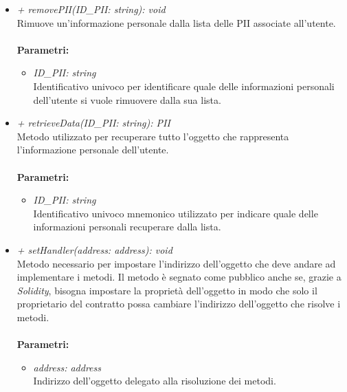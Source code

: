 \begin{itemize}
\begin{itemize}
		\item \textit{+ removePII(ID\_PII: string): void}\\
		Rimuove un'informazione personale dalla lista delle \gls{PII} associate all'utente.\\\\
		\textbf{Parametri:}
		\begin{itemize}
			\item \textit{ID\_PII: string}\\
			Identificativo univoco per identificare quale delle informazioni personali dell'utente si vuole rimuovere dalla sua lista.
		\end{itemize}
		\item \textit{+ retrieveData(ID\_PII: string): PII}\\
		Metodo utilizzato per recuperare tutto l'oggetto che rappresenta l'informazione personale dell'utente.\\\\
		\textbf{Parametri:}
		\begin{itemize}
			\item \textit{ID\_PII: string}\\
			Identificativo univoco mnemonico utilizzato per indicare quale delle informazioni personali recuperare dalla lista.
		\end{itemize}
		\item \textit{+ setHandler(address: address): void}\\
		Metodo necessario per impostare l'indirizzo dell'oggetto che deve andare ad implementare i metodi. Il metodo è segnato come pubblico anche se, grazie a \textit{Solidity}, bisogna impostare la proprietà dell'oggetto in modo che solo il proprietario del contratto possa cambiare l'indirizzo dell'oggetto che risolve i metodi.\\\\
		\textbf{Parametri:}
		\begin{itemize}
			\item \textit{address: address}\\
			Indirizzo dell'oggetto delegato alla risoluzione dei metodi.
		\end{itemize}
	\end{itemize}
\end{itemize}
